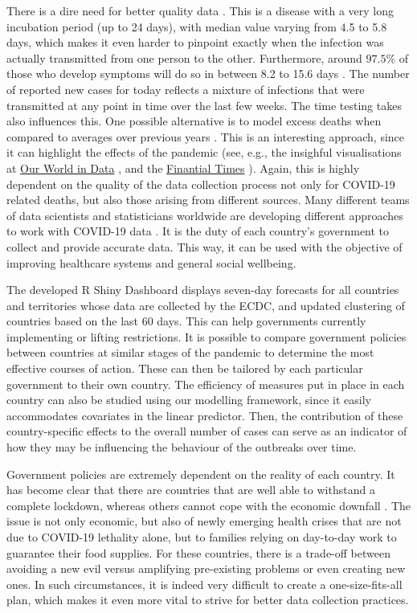 \documentclass[fleqn,10pt]{wlscirep}
\begin{document}
There is a dire need for better quality data \cite{Vespignani2020}. This is a disease with a very long incubation period (up to 24 days\cite{Guan2020}), with median value varying from 4.5 to 5.8 days\cite{Lauer2020}, which makes it even harder to pinpoint exactly when the infection was actually transmitted from one person to the other. Furthermore, around $97.5\%$ of those who develop symptoms will do so in between 8.2 to 15.6 days \cite{Lauer2020}. The number of reported new cases for today reflects a mixture of infections that were transmitted at any point in time over the last few weeks. The time testing takes also influences this. One possible alternative is to model excess deaths when compared to averages over previous years \cite{Kysely2009, Nunes2011}. This is an interesting approach, since it can highlight the effects of the pandemic (see, e.g., the insighful visualisations at \href{https://ourworldindata.org/excess-mortality-covid}{Our World in Data} \cite{Ritchie2020}, and the \href{https://www.ft.com/content/a26fbf7e-48f8-11ea-aeb3-955839e06441}{Finantial Times} \cite{finantial2020}). Again, this is highly dependent on the quality of the data collection process not only for COVID-19 related deaths, but also those arising from different sources. Many different teams of data scientists and statisticians worldwide are developing different approaches to work with COVID-19 data \cite{Calafiore2020, He2020, Petropoulos2020, Wang2020}. It is the duty of each country's government to collect and provide accurate data. This way, it can be used with the objective of improving healthcare systems and general social wellbeing.

The developed R Shiny Dashboard displays seven-day forecasts for all countries and territories whose data are collected by the ECDC, and updated clustering of countries based on the last 60 days. This can help governments currently implementing or lifting restrictions. It is possible to compare government policies between countries at similar stages of the pandemic to determine the most effective courses of action. These can then be tailored by each particular government to their own country. The efficiency of measures put in place in each country can also be studied using our modelling framework, since it easily accommodates covariates in the linear predictor. Then, the contribution of these country-specific effects to the overall number of cases can serve as an indicator of how they may be influencing the behaviour of the outbreaks over time.

Government policies are extremely dependent on the reality of each country. It has become clear that there are countries that are well able to withstand a complete lockdown, whereas others cannot cope with the economic downfall \cite{Mehtar2020}. The issue is not only economic, but also of newly emerging health crises that are not due to COVID-19 lethality alone, but to families relying on day-to-day work to guarantee their food supplies. For these countries, there is a trade-off between avoiding a new evil versus amplifying pre-existing problems or even creating new ones. In such circumstances, it is indeed very difficult to create a one-size-fits-all plan, which makes it even more vital to strive for better data collection practices.
\end{document}
